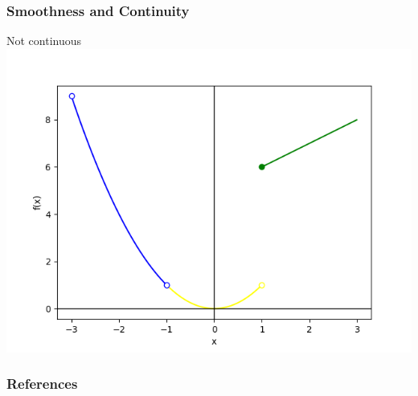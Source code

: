 \documentclass{beamer}
\begin{document}
\begin{frame}
    \frametitle{Smoothness and Continuity}

    Not continuous\\

    \includegraphics[scale=0.5]{figs/fig_4.png}

\end{frame}



\begin{frame}
    \frametitle{References}
\end{frame}
\end{document}

